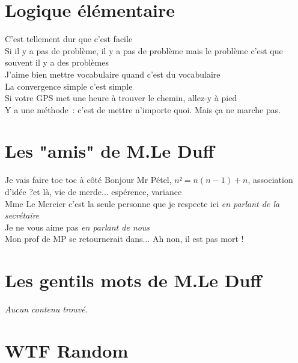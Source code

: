 \documentclass[french, a4paper, openany]{book}
\begin{document}
\section{Logique élémentaire}

	\noindent \og C'est tellement dur que c'est facile \fg \\
	\og Si il y a pas de problème, il y a pas de problème mais le problème c'est que souvent il y a des problèmes \fg \\
	\og J'aime bien mettre vocabulaire quand c'est du vocabulaire \fg \\
	\og La convergence simple c'est simple \fg \\
	\og Si votre GPS met une heure à trouver le chemin, allez-y à pied \fg \\
	\og Y a une méthode~: c'est de mettre n'importe quoi. Mais ça ne marche pas. \fg \\

\section{Les "amis" de M.Le Duff}

	\noindent \og Je vais faire toc toc à côté \fg Bonjour Mr Pétel, $n² = n(n-1) + n$, association d'idée ?\og et là, vie de merde... \fg espérence, variance\og \fg \\
	\og Mme Le Mercier c'est la seule personne que je respecte ici \fg \emph{en parlant de la secrétaire} \\
	\og Je ne vous aime pas \fg \emph{en parlant de nous} \\
	\og Mon prof de MP se retournerait dans... Ah non, il est pas mort ! \fg \\

\section{Les gentils mots de M.Le Duff}

	 \noindent \emph{Aucun contenu trouvé.} \\
 
\section{WTF Random}
\end{document}
